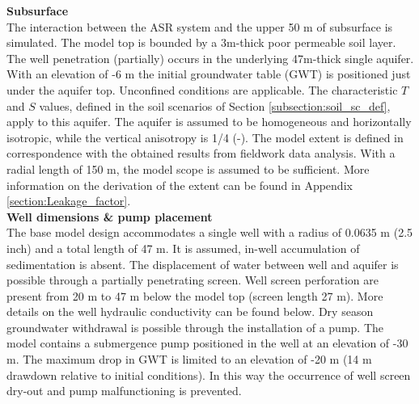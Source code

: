 %
%

\textbf{Subsurface} \\
The interaction between the ASR system and the upper 50 m of subsurface is simulated. The model top is bounded by a 3m-thick poor permeable soil layer. The well penetration (partially) occurs in the underlying 47m-thick single aquifer. With an elevation of -6 m the initial groundwater table (GWT) is positioned just under the aquifer top. Unconfined conditions are applicable. The characteristic $T$ and $S$ values, defined in the soil scenarios of Section \ref{subsection:soil_sc_def}, apply to this aquifer. The aquifer is assumed to be homogeneous and horizontally isotropic, while the vertical anisotropy is 1/4 (-). The model extent is defined in correspondence with the obtained results from fieldwork data analysis. With a radial length of 150 m, the model scope is assumed to be sufficient. More information on the derivation of the extent can be found in Appendix \ref{section:Leakage_factor}. \\


\textbf{Well dimensions \& pump placement} \\
The base model design accommodates a single well with a radius of 0.0635 m (2.5 inch) and a total length of 47 m. It is assumed, in-well accumulation of sedimentation is absent. The displacement of water between well and aquifer is possible through a partially penetrating screen. Well screen perforation are present from 20 m to 47 m below the model top (screen length 27 m). More details on the well hydraulic conductivity can be found below. Dry season groundwater withdrawal is possible through the installation of a pump. The model contains a submergence pump positioned in the well at an elevation of -30 m. The maximum drop in GWT is limited to an elevation of -20 m (14 m drawdown relative to initial conditions). In this way the occurrence of well screen dry-out and pump malfunctioning is prevented. \\

